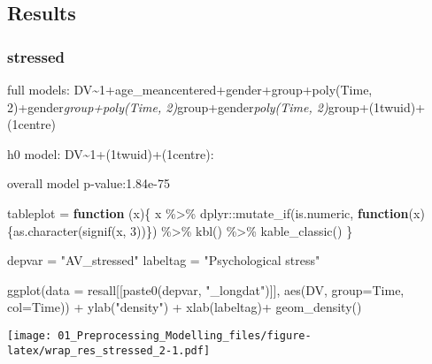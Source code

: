 \documentclass[
]{article}
\newenvironment{Shaded}{\begin{snugshade}}{\end{snugshade}}
\newcommand{\AttributeTok}[1]{\textcolor[rgb]{0.77,0.63,0.00}{#1}}
\newcommand{\ControlFlowTok}[1]{\textcolor[rgb]{0.13,0.29,0.53}{\textbf{#1}}}
\newcommand{\DecValTok}[1]{\textcolor[rgb]{0.00,0.00,0.81}{#1}}
\newcommand{\FunctionTok}[1]{\textcolor[rgb]{0.00,0.00,0.00}{#1}}
\newcommand{\NormalTok}[1]{#1}
\newcommand{\OtherTok}[1]{\textcolor[rgb]{0.56,0.35,0.01}{#1}}
\newcommand{\SpecialCharTok}[1]{\textcolor[rgb]{0.00,0.00,0.00}{#1}}
\newcommand{\StringTok}[1]{\textcolor[rgb]{0.31,0.60,0.02}{#1}}
\begin{document}
\hypertarget{results}{%
\subsection{Results}\label{results}}

\hypertarget{stressed}{%
\subsubsection{stressed}\label{stressed}}

full models:
DV\textasciitilde1+age\_meancentered+gender+group+poly(Time,
2)+gender\emph{group+poly(Time, 2)}group+gender\emph{poly(Time,
2)}group+(1\textbar twuid)+(1\textbar centre)

h0 model: DV\textasciitilde1+(1\textbar twuid)+(1\textbar centre):

overall model p-value:1.84e-75

\begin{Shaded}
\begin{Highlighting}[]
\NormalTok{tableplot }\OtherTok{=} \ControlFlowTok{function}\NormalTok{ (x)\{}
\NormalTok{  x }\SpecialCharTok{\%\textgreater{}\%}\NormalTok{ dplyr}\SpecialCharTok{::}\FunctionTok{mutate\_if}\NormalTok{(is.numeric, }\ControlFlowTok{function}\NormalTok{(x)\{}\FunctionTok{as.character}\NormalTok{(}\FunctionTok{signif}\NormalTok{(x, }\DecValTok{3}\NormalTok{))\}) }\SpecialCharTok{\%\textgreater{}\%} \FunctionTok{kbl}\NormalTok{() }\SpecialCharTok{\%\textgreater{}\%} \FunctionTok{kable\_classic}\NormalTok{()}
\NormalTok{  \}}


\NormalTok{depvar }\OtherTok{=} \StringTok{"AV\_stressed"}
\NormalTok{labeltag }\OtherTok{=} \StringTok{"Psychological stress"}

\FunctionTok{ggplot}\NormalTok{(}\AttributeTok{data =}\NormalTok{ resall[[}\FunctionTok{paste0}\NormalTok{(depvar, }\StringTok{"\_longdat"}\NormalTok{)]], }
       \FunctionTok{aes}\NormalTok{(DV, }\AttributeTok{group=}\NormalTok{Time, }\AttributeTok{col=}\NormalTok{Time)) }\SpecialCharTok{+} 
  \FunctionTok{ylab}\NormalTok{(}\StringTok{"density"}\NormalTok{) }\SpecialCharTok{+} \FunctionTok{xlab}\NormalTok{(labeltag)}\SpecialCharTok{+}
  \FunctionTok{geom\_density}\NormalTok{()}
\end{Highlighting}
\end{Shaded}

\texttt{[image: 01\_Preprocessing\_Modelling\_files/figure-latex/wrap\_res\_stressed\_2-1.pdf]}
\end{document}
